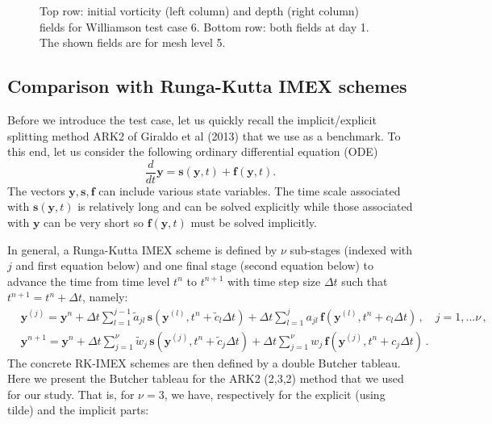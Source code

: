 \documentclass[a4paper, 12pt]{article}
\begin{document}
\begin{figure}
\begin{tabular}{cc}
 \end{tabular}\vspace{-10pt}
  \caption{Top row: initial vorticity (left column) and depth (right column) fields
  for Williamson test case 6. Bottom row: both fields at day 1. The shown fields are for mesh level 5.
  }
 \label{tc6_fields}
\end{figure}



\subsection{Comparison with Runga-Kutta IMEX schemes}

\newcommand{\ybf}{\mathbf{y}}
\newcommand{\sbf}{\mathbf{s}}
\newcommand{\fbf}{\mathbf{f}}

Before we introduce the test case, let us quickly recall the implicit/explicit
splitting method ARK2 of Giraldo et al (2013) that we use as a benchmark.
To this end, let us consider the following ordinary differential equation (ODE)
\begin{equation}
\frac{d}{dt} \mathbf{y} = \mathbf{s}(\mathbf{y}, t) + \mathbf{f} (\mathbf {y}, t).
\end{equation}
The vectors $\mathbf{y}, \mathbf{s} , \mathbf{f}$ can include various state variables.
The time scale associated with $ \mathbf{s}(\mathbf{y}, t)$ is relatively long
and can be solved explicitly while those associated with $\mathbf {y}$
can be very short so $ \mathbf{f} (\mathbf {y}, t)$ must be solved implicitly.

In general, a Runga-Kutta IMEX scheme is defined by $\nu$ sub-stages (indexed with $j$ and first equation below) and one final stage (second equation below) to advance the time from time level $t^n$ to $t^{n+1}$ with time step size $\Delta t$ such that
$t^{n+1} = t^n + \Delta t$, namely:
\begin{align}
&  \ybf^{(j)}  = \ybf^n + \Delta t \sum_{l=1}^{j-1} \tilde a_{jl} \,  \sbf(\ybf^{(l)}, t^n + \tilde c_{l}\Delta t) + \Delta t \sum_{l=1}^{j} a_{jl} \,  \fbf(\ybf^{(l)}, t^n + c_{l}\Delta t) \, ,  \quad j = 1,...\nu \, , \\
&  \ybf^{n+1}  = \ybf^n + \Delta t \sum_{j=1}^{\nu} \tilde w_{j} \,  \sbf(\ybf^{(j)}, t^n + \tilde c_{j}\Delta t) + \Delta t \sum_{j=1}^{\nu} w_{j} \,  \fbf(\ybf^{(j)}, t^n + c_{j}\Delta t) \, .
\end{align}
The concrete RK-IMEX schemes are then defined by a double Butcher tableau. Here we present the Butcher tableau for the ARK2 (2,3,2) method that we used for our study. That is, for $\nu = 3$, we have, respectively for the explicit (using tilde) and the implicit parts:
\end{document}
